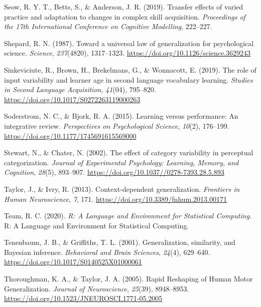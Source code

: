 \documentclass[
  11pt,
  letterpaper,
]{article}
\newlength{\cslhangindent}
\newenvironment{CSLReferences}[2] %
 {\begin{list}{}{%
  \setlength{\itemindent}{0pt}
  \setlength{\leftmargin}{0pt}
  \setlength{\parsep}{0pt}
  \ifodd #1
   \setlength{\leftmargin}{\cslhangindent}
   \setlength{\itemindent}{-1\cslhangindent}
  \fi
  \setlength{\itemsep}{#2\baselineskip}}}
 {\end{list}}
\begin{document}
\begin{CSLReferences}{1}{0}
Seow, R. Y. T., Betts, S., \& Anderson, J. R. (2019). Transfer effects
of varied practice and adaptation to changes in complex skill
acquisition. \emph{Proceedings of the 17th International Conference on
Cognitive Modelling}, 222--227.

Shepard, R. N. (1987). Toward a universal law of generalization for
psychological science. \emph{Science}, \emph{237}(4820), 1317--1323.
\url{https://doi.org/10.1126/science.3629243}

Sinkeviciute, R., Brown, H., Brekelmans, G., \& Wonnacott, E. (2019).
The role of input variability and learner age in second language
vocabulary learning. \emph{Studies in Second Language Acquisition},
\emph{41}(04), 795--820. \url{https://doi.org/10.1017/S0272263119000263}

Soderstrom, N. C., \& Bjork, R. A. (2015). Learning versus performance:
{An} integrative review. \emph{Perspectives on Psychological Science},
\emph{10}(2), 176--199. \url{https://doi.org/10.1177/1745691615569000}

Stewart, N., \& Chater, N. (2002). The effect of category variability in
perceptual categorization. \emph{Journal of Experimental Psychology:
Learning, Memory, and Cognition}, \emph{28}(5), 893--907.
\url{https://doi.org/10.1037//0278-7393.28.5.893}

Taylor, J., \& Ivry, R. (2013). Context-dependent generalization.
\emph{Frontiers in Human Neuroscience}, \emph{7}, 171.
\url{https://doi.org/10.3389/fnhum.2013.00171}

Team, R. C. (2020). \emph{R: {A Language} and {Environment} for
{Statistical Computing}}. R: A Language and Environment for Statistical
Computing.

Tenenbaum, J. B., \& Griffiths, T. L. (2001). Generalization,
similarity, and {Bayesian} inference. \emph{Behavioral and Brain
Sciences}, \emph{24}(4), 629--640.
\url{https://doi.org/10.1017/S0140525X01000061}

Thoroughman, K. A., \& Taylor, J. A. (2005). Rapid {Reshaping} of {Human
Motor Generalization}. \emph{Journal of Neuroscience}, \emph{25}(39),
8948--8953. \url{https://doi.org/10.1523/JNEUROSCI.1771-05.2005}


\end{CSLReferences}
\end{document}
